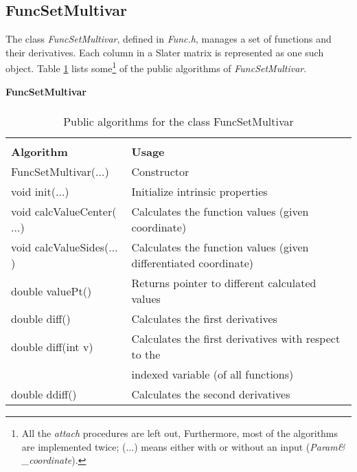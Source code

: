 \subsection{FuncSetMultivar}

The class \emph{FuncSetMultivar}, defined in \emph{Func.h}, manages a
set of functions and their 
derivatives. Each column in a Slater matrix is represented as one such
object. Table \ref{FuncSetMultivar} lists some\footnote{All the
  \emph{attach} procedures are left out, Furthermore, most of the
  algorithms are implemented twice; ($\dots$) means either with or
  without an input (\emph{Param\& \_coordinate}).} of the public algorithms
of \emph{FuncSetMultivar}.

\begin{table}[hbtp]
\begin{center} {\large \bf FuncSetMultivar} \\ 
$\phantom{a}$ \\
\begin{tabular}{ll}
\hline\\ 
{\bf Algorithm}                   & {\bf Usage} \\
FuncSetMultivar($\dots$)          & Constructor\\
void init($\dots$)                & Initialize intrinsic properties\\
void calcValueCenter($\dots$)     & Calculates the function values (given coordinate)\\
void calcValueSides($\dots$)      & Calculates the function values (given differentiated coordinate)\\

double valuePt()                  & Returns pointer to different calculated values\\
double diff()                     & Calculates the first derivatives\\
double diff(int v)                & Calculates the first derivatives
with respect to the\\
                                  & indexed variable (of all functions)\\
double ddiff()                    & Calculates the second derivatives\\
\hline
\end{tabular} 
 \end{center}
  \caption{Public algorithms for the class FuncSetMultivar}
\label{FuncSetMultivar}
\end{table}

